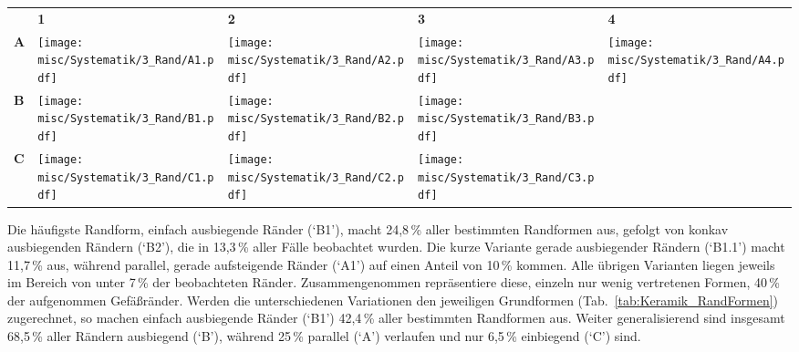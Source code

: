 \begin{figure*}[!tb]
	\centering
	{\small
		\begin{tabular}{ >{\centering\arraybackslash} m{} >{\centering\arraybackslash} m{} >{\centering\arraybackslash} m{} >{\centering\arraybackslash} m{} >{\centering\arraybackslash} m{}}
			& \textbf{1} & \textbf{2} & \textbf{3} & \textbf{4} \\
			\textbf{A} & \texttt{[image: misc/Systematik/3\_Rand/A1.pdf]} & \texttt{[image: misc/Systematik/3\_Rand/A2.pdf]} & \texttt{[image: misc/Systematik/3\_Rand/A3.pdf]} & \texttt{[image: misc/Systematik/3\_Rand/A4.pdf]} \\
			\textbf{B} & \texttt{[image: misc/Systematik/3\_Rand/B1.pdf]} & \texttt{[image: misc/Systematik/3\_Rand/B2.pdf]} & \texttt{[image: misc/Systematik/3\_Rand/B3.pdf]} & \\
			\textbf{C} & \texttt{[image: misc/Systematik/3\_Rand/C1.pdf]} & \texttt{[image: misc/Systematik/3\_Rand/C2.pdf]} & \texttt{[image: misc/Systematik/3\_Rand/C3.pdf]} & \\
	\end{tabular}}
	\caption{Keramik: Systematisierung der grundsätzlichen Randformen (A--C).}
	\label{tab:Keramik_RandFormen}
\end{figure*}

Die häufigste Randform, einfach ausbiegende Ränder (\enquote*{B1}), macht 24,8\,\% aller bestimmten Randformen aus, gefolgt von konkav ausbiegenden Rändern (\enquote*{B2}), die in 13,3\,\% aller Fälle beobachtet wurden. Die kurze Variante gerade ausbiegender Rändern (\enquote*{B1.1}) macht 11,7\,\% aus, während parallel, gerade aufsteigende Ränder (\enquote*{A1}) auf einen Anteil von 10\,\% kommen. Alle übrigen Varianten liegen jeweils im Bereich von unter 7\,\% der beobachteten Ränder. Zusammengenommen repräsentiere diese, einzeln nur wenig vertretenen Formen, 40\,\% der aufgenommen Gefäßränder. Werden die unterschiedenen Variationen den jeweiligen Grundformen (Tab.~\ref{tab:Keramik_RandFormen}) zugerechnet, so machen einfach ausbiegende Ränder (\enquote*{B1}) 42,4\,\% aller bestimmten Randformen aus. Weiter generalisierend sind insgesamt 68,5\,\% aller Rändern ausbiegend (\enquote*{B}), während 25\,\% parallel (\enquote*{A}) verlaufen und nur 6,5\,\% einbiegend (\enquote*{C}) sind.

